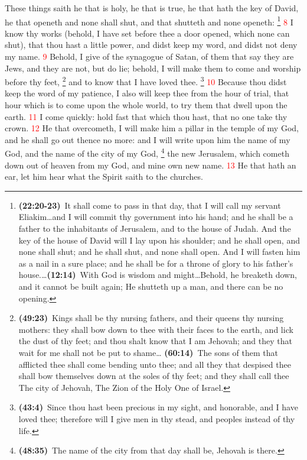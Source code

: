 \documentclass[12pt,twoside]{memoir}
\newcommand{\cbibleref}[3]{\textbf{\ibibleverse{#1}(#2)}\ {#3}}
\newcommand{\cbiblechvs}[3]{\textbf{\ibiblechvs{#1}(#2)}\ {#3}}
\newcommand{\cbiblefoot}[3]{\footnote{\cbibleref{#1}{#2}{#3}}}
\newcommand{\cbiblefootduo}[6]{\footnote{\cbibleref{#1}{#2}{#3}\ldots \cbibleref{#4}{#5}{#6}}}
\newcommand{\vnum}[1]{\textcolor{red}{\normalsize{#1}}}
\begin{document}
These things saith he that is holy, he that is true, he that hath the key of David, he that openeth and none shall shut, and that shutteth and none openeth:%
	\cbiblefootduo{Isaiah}{22:20-23}{It shall come to pass in that day, that I will call my servant Eliakim\ldots and I will commit thy government into his hand; and he shall be a father to the inhabitants of Jerusalem, and to the house of Judah. And the key of the house of David will I lay upon his shoulder; and he shall open, and none shall shut; and he shall shut, and none shall open. And I will fasten him as a nail in a sure place; and he shall be for a throne of glory to his father’s house.}%
				{Job}{12:14}{With God is wisdom and might\ldots Behold, he breaketh down, and it cannot be built again; He shutteth up a man, and there can be no opening.}
\vnum{8} I know thy works (behold, I have set before thee a door opened, which none can shut), that thou hast a little power, and didst keep my word, and didst not deny my name.  \vnum{9} Behold, I give of the synagogue of Satan, of them that say they are Jews, and they are not, but do lie; behold, I will make them to come and worship before thy feet,%
	\footnote{\cbibleref{Isaiah}{49:23}{Kings shall be thy nursing fathers, and their queens thy nursing mothers: they shall bow down to thee with their faces to the earth, and lick the dust of thy feet; and thou shalt know that I am Jehovah; and they that wait for me shall not be put to shame}\ldots%
				\cbiblechvs{Isaiah}{60:14}{The sons of them that afflicted thee shall come bending unto thee; and all they that despised thee shall bow themselves down at the soles of thy feet; and they shall call thee The city of Jehovah, The Zion of the Holy One of Israel.}}
 and to know that I have loved thee. %
 	\cbiblefoot{Isaiah}{43:4}{Since thou hast been precious in my sight, and honorable, and I have loved thee; therefore will I give men in thy stead, and peoples instead of thy life.}
\vnum{10} Because thou didst keep the word of my patience, I also will keep thee from the hour of trial, that hour which is to come upon the whole world, to try them that dwell upon the earth. %
\vnum{11} I come quickly: hold fast that which thou hast, that no one take thy crown. %
\vnum{12} He that overcometh, I will make him a pillar in the temple of my God, and he shall go out thence no more: and I will write upon him the name of my God, and the name of the city of my God,%
	\cbiblefoot{Ezekiel}{48:35}{The name of the city from that day shall be, Jehovah is there.}
 the new Jerusalem, which cometh down out of heaven from my God, and mine own new name. %
\vnum{13} He that hath an ear, let him hear what the Spirit saith to the churches.
\end{document}
